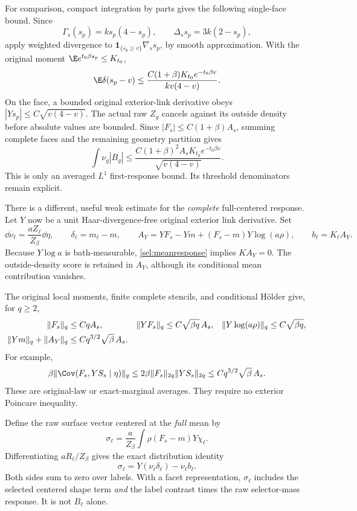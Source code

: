 For comparison, compact integration by parts gives the following single-face bound. Since
\[
 \Gamma_s(s_p)=k s_p(4-s_p),\qquad
 \Delta_s s_p=3k(2-s_p),
\]
apply weighted divergence to \(\mathbf1_{\{s_p\ge v\}}\nabla_s s_p\), by smooth approximation. With the original moment \(\E e^{t_0\beta s_p}\le K_{t_0}\),
\begin{equation}
 \E\delta(s_p-v)
 \le\frac{C(1+\beta)K_{t_0}e^{-t_0\beta v}}{k v(4-v)}.
 \label{sel:face}
\end{equation}
On the face, a bounded original exterior-link derivative obeys \(|Ys_p|\le C\sqrt{v(4-v)}\). The actual raw \(Z_g\) cancels against its outside density before absolute values are bounded. Since \(|F_s|\le C(1+\beta)A_s\), summing complete faces and the remaining geometry partition gives
\begin{equation}
 \int\nu_g|B_g|
 \le
 \frac{C(1+\beta)^2A_sK_{t_0}e^{-t_0\beta v}}
      {\sqrt{v(4-v)}}.
 \label{sel:shapeLone}
\end{equation}
This is only an averaged \(L^1\) first-response bound. Its threshold denominators remain explicit.

There is a different, useful weak estimate for the \emph{complete} full-centered response. Let \(Y\) now be a unit Haar-divergence-free original exterior link derivative. Set
\[
 \dd\nu_\ell=\frac{aZ_\ell}{Z_\beta}\dd\eta,\qquad
 \delta_\ell=m_\ell-m,\qquad
 A_Y=YF_s-Ym+(F_s-m)Y\log(a\rho),\qquad b_\ell=K_\ell A_Y.
\]
Because \(Y\log a\) is bath-measurable, \eqref{sel:meanresponse} implies \(KA_Y=0\). The outside-density score is retained in \(A_Y\), although its conditional mean contribution vanishes.

The original local moments, finite complete stencils, and conditional Hölder give, for \(q\ge2\),
\begin{align}
 \|F_s\|_q&\le CqA_s,&
 \|YF_s\|_q&\le C\sqrt{\beta q}\,A_s,&
 \|Y\log(a\rho)\|_q&\le C\sqrt{\beta q},\notag\\
 \|Ym\|_q+\|A_Y\|_q&\le Cq^{3/2}\sqrt\beta\,A_s .
 \label{sel:bulkmoments}
\end{align}
For example,
\[
 \beta\|\Cov(F_s,YS_s\mid\eta)\|_q
 \le2\beta\|F_s\|_{2q}\|YS_s\|_{2q}
 \le Cq^{3/2}\sqrt\beta\,A_s.
\]
These are original-law or exact-marginal averages. They require no exterior Poincare inequality.

Define the raw surface vector centered at the \emph{full} mean by
\[
 \sigma_\ell=\frac{a}{Z_\beta}
                 \int\rho(F_s-m)Y\chi_\ell .
\]
Differentiating \(aR_\ell/Z_\beta\) gives the exact distribution identity
\begin{equation}
 \sigma_\ell=Y(\nu_\ell\delta_\ell)-\nu_\ell b_\ell.
 \label{sel:weakidentity}
\end{equation}
Both sides sum to zero over labels. With a facet representation, \(\sigma_\ell\) includes the selected centered shape term \emph{and} the label contrast times the raw selector-mass response. It is not \(B_\ell\) alone.

